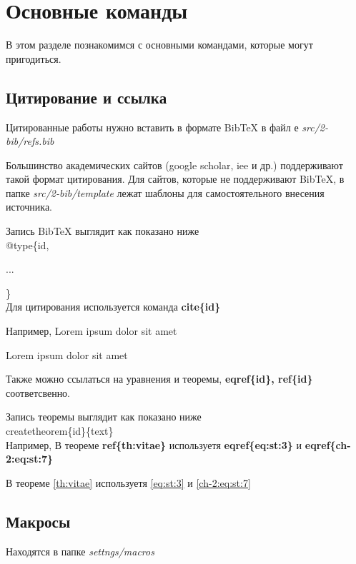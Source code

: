 \chapter{Основные команды}

В этом разделе познакомимся с основными командами, которые могут пригодиться.

\section{Цитирование и ссылка}
Цитированные работы нужно вставить в формате BibTeX в файл е \textit{src/2-bib/refs.bib}

Большинство академических сайтов (google scholar, iee и др.) поддерживают такой формат цитирования. Для сайтов, которые не поддерживают BibTeX, в папке \textit{src/2-bib/template} лежат шаблоны для самостоятельного внесения источника.

Запись BibTeX выглядит как показано ниже\\[0.25cm]


@type\{id,

...

\}\\[0.25cm]


Для цитирования используется команда \textbf{cite\{id\}}

Например, Lorem ipsum dolor sit amet 

Lorem ipsum dolor sit amet \cite{pobedryaMSS}

Также можно ссылаться на уравнения и теоремы, \textbf{eqref\{id\}, ref\{id\}} соответсвенно.

Запись теоремы выглядит как показано ниже\\[0.25cm]


createtheorem\;\{id\}\;\{text\}\\[0.25cm]



Например, В теореме \textbf{ref\{th:vitae\}} используетя \textbf{eqref\{eq:st:3\}} и 
\textbf{eqref\{ch-2:eq:st:7\}}

В теореме \ref{th:vitae} используетя \eqref{eq:st:3} и \eqref{ch-2:eq:st:7}


\clearpage
\section{Макросы}
Находятся в папке \textit{settngs/macros}

